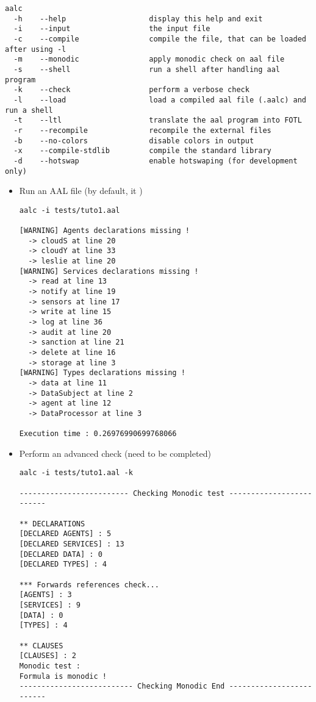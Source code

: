 {
\lstset{style=shell}
\begin{lstlisting}[caption={aalc options}]
aalc 
  -h    --help                   display this help and exit
  -i    --input                  the input file
  -c    --compile                compile the file, that can be loaded after using -l
  -m    --monodic                apply monodic check on aal file
  -s    --shell                  run a shell after handling aal program
  -k    --check                  perform a verbose check
  -l    --load                   load a compiled aal file (.aalc) and run a shell
  -t    --ltl                    translate the aal program into FOTL
  -r    --recompile              recompile the external files 
  -b    --no-colors              disable colors in output
  -x    --compile-stdlib         compile the standard library
  -d    --hotswap                enable hotswaping (for development only)
\end{lstlisting}


\begin{itemize}
	\item Run an AAL file (by default, it )
\begin{lstlisting}
aalc -i tests/tuto1.aal

[WARNING] Agents declarations missing !
  -> cloudS at line 20
  -> cloudY at line 33
  -> leslie at line 20
[WARNING] Services declarations missing !
  -> read at line 13
  -> notify at line 19
  -> sensors at line 17
  -> write at line 15
  -> log at line 36
  -> audit at line 20
  -> sanction at line 21
  -> delete at line 16
  -> storage at line 3
[WARNING] Types declarations missing !
  -> data at line 11
  -> DataSubject at line 2
  -> agent at line 12
  -> DataProcessor at line 3

Execution time : 0.26976990699768066
\end{lstlisting}

	\item Perform an advanced check (need to be completed)
\begin{lstlisting}
aalc -i tests/tuto1.aal -k

------------------------- Checking Monodic test -------------------------

** DECLARATIONS
[DECLARED AGENTS] : 5
[DECLARED SERVICES] : 13
[DECLARED DATA] : 0
[DECLARED TYPES] : 4

*** Forwards references check...
[AGENTS] : 3
[SERVICES] : 9
[DATA] : 0
[TYPES] : 4

** CLAUSES
[CLAUSES] : 2
Monodic test :
Formula is monodic !
-------------------------- Checking Monodic End -------------------------
\end{lstlisting}



\end{itemize}}
